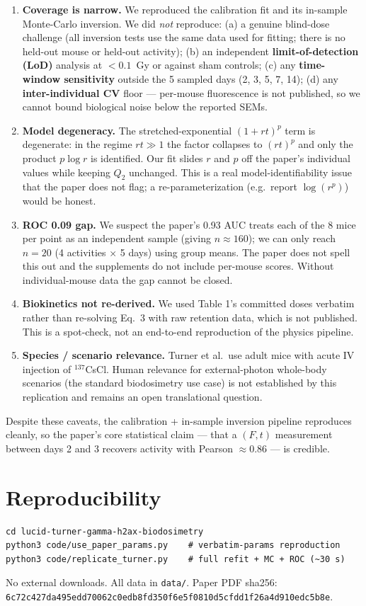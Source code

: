 \documentclass[11pt]{article}
\begin{document}
\begin{enumerate}
\item \textbf{Coverage is narrow.} We reproduced the calibration fit and
its in-sample Monte-Carlo inversion. We did \emph{not} reproduce:
(a) a genuine blind-dose challenge (all inversion tests use the same
data used for fitting; there is no held-out mouse or held-out activity);
(b) an independent \textbf{limit-of-detection (LoD)} analysis at
$<0.1$~Gy or against sham controls;
(c) any \textbf{time-window sensitivity} outside the 5 sampled days
(2, 3, 5, 7, 14);
(d) any \textbf{inter-individual CV} floor — per-mouse fluorescence is
not published, so we cannot bound biological noise below the reported SEMs.
\item \textbf{Model degeneracy.} The stretched-exponential $(1+rt)^p$
term is degenerate: in the regime $rt\!\gg\!1$ the factor collapses to
$(rt)^p$ and only the product $p\log r$ is identified. Our fit slides
$r$ and $p$ off the paper's individual values while keeping $Q_2$
unchanged. This is a real model-identifiability issue that the paper
does not flag; a re-parameterization (e.g.\ report $\log(r^p)$) would
be honest.
\item \textbf{ROC 0.09 gap.} We suspect the paper's 0.93 AUC treats each
of the 8 mice per point as an independent sample (giving $n\!\approx\!160$);
we can only reach $n=20$ (4 activities $\times$ 5 days) using group means.
The paper does not spell this out and the supplements do not include
per-mouse scores. Without individual-mouse data the gap cannot be closed.
\item \textbf{Biokinetics not re-derived.} We used Table 1's committed
doses verbatim rather than re-solving Eq.~3 with raw retention data,
which is not published. This is a spot-check, not an end-to-end
reproduction of the physics pipeline.
\item \textbf{Species / scenario relevance.} Turner et al.\ use adult
mice with acute IV injection of $^{137}$CsCl. Human relevance for
external-photon whole-body scenarios (the standard biodosimetry use
case) is not established by this replication and remains an open
translational question.
\end{enumerate}

Despite these caveats, the calibration + in-sample inversion pipeline
reproduces cleanly, so the paper's core statistical claim — that a
$(F,t)$ measurement between days 2 and 3 recovers activity with
Pearson $\approx 0.86$ — is credible.



\section{Reproducibility}
\begin{verbatim}
cd lucid-turner-gamma-h2ax-biodosimetry
python3 code/use_paper_params.py    # verbatim-params reproduction
python3 code/replicate_turner.py    # full refit + MC + ROC (~30 s)
\end{verbatim}
No external downloads. All data in \texttt{data/}. Paper PDF
sha256: \texttt{6c72c427da495edd70062c0edb8fd350f6e5f0810d5cfdd1f26a4d910edc5b8e}.
\end{document}
